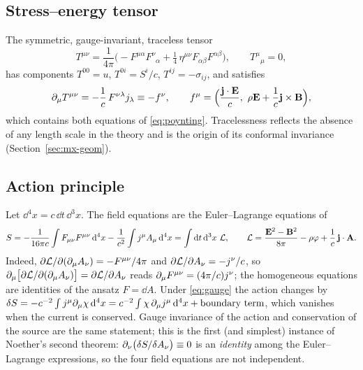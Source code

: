 \subsection{Stress--energy tensor}

The symmetric, gauge-invariant, traceless tensor
\begin{equation}\label{eq:T}
T^{\mu\nu}=\frac1{4\pi}\Big(-F^{\mu\alpha}F^{\nu}{}_{\alpha}+\tfrac14\,\eta^{\mu\nu}F_{\alpha\beta}F^{\alpha\beta}\Big),\qquad
T^\mu{}_\mu=0,
\end{equation}
has components $T^{00}=u$, $T^{0i}=S^i/c$, $T^{ij}=-\sigma_{ij}$, and
satisfies
\begin{equation}\label{eq:T-conservation}
\pa_\mu T^{\mu\nu}=-\frac1c\,F^{\nu\lambda}j_\lambda\equiv-f^\nu,\qquad
f^\mu=\Big(\frac{\vj\cdot\vE}{c},\ \rho\vE+\frac1c\vj\times\vB\Big),
\end{equation}
which contains both equations of \eqref{eq:poynting}.  Tracelessness
reflects the absence of any length scale in the theory and is the origin
of its conformal invariance (Section~\ref{sec:mx-geom}).

\subsection{Action principle}

Let $\dd^4x=c\,\dd t\,\dd^3x$.  The field equations are the
Euler--Lagrange equations of
\begin{equation}\label{eq:action}
S=-\frac1{16\pi c}\int F_{\mu\nu}F^{\mu\nu}\,\mathrm{d}^4x-\frac1{c^2}\int j^\mu A_\mu\,\mathrm{d}^4x
=\int\mathrm{d} t\,\mathrm{d}^3x\ \mathcal L,\qquad
\mathcal L=\frac{\mathbf{E}^2-\mathbf{B}^2}{8\pi}-\rho\varphi+\frac1c\,\mathbf{j}\cdot\mathbf{A} .
\end{equation}
Indeed, $\partial\mathcal L/\partial(\partial_\mu A_\nu)=-F^{\mu\nu}/4\pi$ and
$\partial\mathcal L/\partial A_\nu=-j^\nu/c$, so
$\partial_\mu\big[\partial\mathcal L/\partial(\partial_\mu A_\nu)\big]=\partial\mathcal L/\partial A_\nu$
reads $\partial_\mu F^{\mu\nu}=(4\pi/c)j^\nu$; the homogeneous equations are
identities of the ansatz $F=\dd A$.  Under \eqref{eq:gauge} the action
changes by $\delta S=-c^{-2}\int j^\mu\partial_\mu\chi\,\mathrm{d}^4x
=c^{-2}\int\chi\,\partial_\mu j^\mu\,\mathrm{d}^4x+\text{boundary term}$, which vanishes
when the current is conserved.  Gauge invariance of the action and
conservation of the source are the same statement; this is the first
(and simplest) instance of Noether's second theorem:
$\partial_\nu\big(\delta S/\delta A_\nu\big)\equiv0$ is an \emph{identity} among
the Euler--Lagrange expressions, so the four field equations are not
independent.

